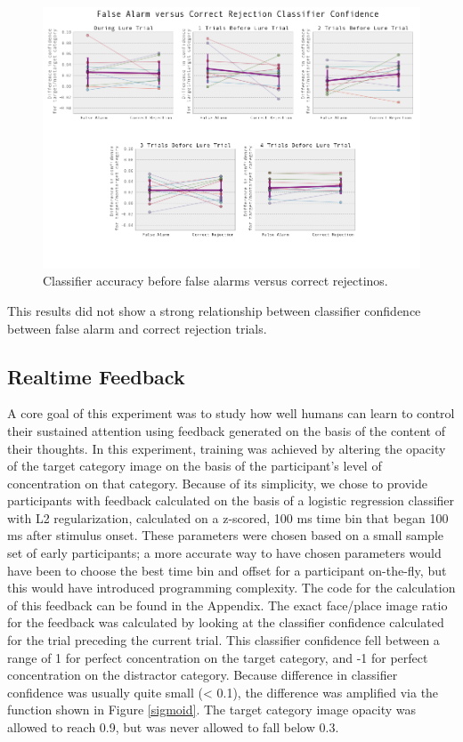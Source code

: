 \documentclass[11pt]{report}
\begin{document}
\begin{figure}[t]
\centerline{
\includegraphics[width=6in]{trialsbeforelureacc}
}
\caption{Classifier accuracy before false alarms versus correct rejectinos.\label{falsealarmcorrectreject}}
\end{figure}

This results did not show a strong relationship between classifier confidence between false alarm and correct rejection trials.

\subsection{Realtime Feedback}

A core goal of this experiment was to study how well humans can learn to control their sustained attention using feedback generated on the basis of the content of their thoughts.  In this experiment, training was achieved by altering the opacity of the target category image on the basis of the participant's level of concentration on that category.  Because of its simplicity, we chose to provide participants with feedback calculated on the basis of a logistic regression classifier with L2 regularization, calculated on a z-scored, 100 ms time bin that began 100 ms after stimulus onset.  These parameters were chosen based on a small sample set of early participants; a more accurate way to have chosen parameters would have been to choose the best time bin and offset for a participant on-the-fly, but this would have introduced programming complexity.  The code for the calculation of this feedback can be found in the Appendix.  The exact face/place image ratio for the feedback was calculated by looking at the classifier confidence calculated for the trial preceding the current trial.  This classifier confidence fell between a range of 1 for perfect concentration on the target category, and -1 for perfect concentration on the distractor category.  Because difference in classifier confidence was usually quite small (< 0.1), the difference was amplified via the function shown in Figure \ref{sigmoid}.  The target category image opacity was allowed to reach 0.9, but was never allowed to fall below 0.3.  
\end{document}
